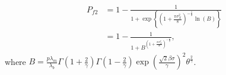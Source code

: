 \begin{align}
\label{eq:analytical_result_approach_2}
P_{f2} &= 1 - \frac{1}{1 + \exp\left\lbrace \left( 1 +\frac{\pi \sigma_X^2}{8} \right)^{-\frac{1}{2}} \ln(B) \right\rbrace} \nonumber\\
&= 1-\frac{1}{1 + B^{\left( 1 +\frac{\pi \sigma_X^2}{8} \right)^{-\frac{1}{2}}}},
\end{align}
where $B= \frac{p\lambda_m}{\lambda_b}\Gamma(1+\frac{2}{\gamma}) \Gamma(1-\frac{2}{\gamma}) \exp \left( \frac{\sqrt{2}\beta\sigma}{\gamma}\right) ^2 \theta^{\frac{2}{\gamma}}$.